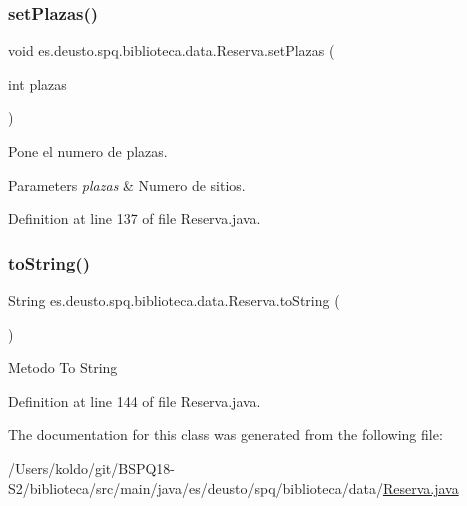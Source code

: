 \subsubsection{\texorpdfstring{set\+Plazas()}{setPlazas()}}
{\footnotesize\ttfamily void es.\+deusto.\+spq.\+biblioteca.\+data.\+Reserva.\+set\+Plazas (\begin{DoxyParamCaption}\item[{int}]{plazas }\end{DoxyParamCaption})}

Pone el numero de plazas. 
\begin{DoxyParams}{Parameters}
{\em plazas} & Numero de sitios. \\
\hline
\end{DoxyParams}


Definition at line 137 of file Reserva.\+java.

\mbox{\label{classes_1_1deusto_1_1spq_1_1biblioteca_1_1data_1_1_reserva_a07deac8f8e9adabfc2f927a22593c322}} 
\subsubsection{\texorpdfstring{to\+String()}{toString()}}
{\footnotesize\ttfamily String es.\+deusto.\+spq.\+biblioteca.\+data.\+Reserva.\+to\+String (\begin{DoxyParamCaption}{ }\end{DoxyParamCaption})}

Metodo To String 

Definition at line 144 of file Reserva.\+java.



The documentation for this class was generated from the following file\+:\begin{DoxyCompactItemize}
\item 
/\+Users/koldo/git/\+B\+S\+P\+Q18-\/\+S2/biblioteca/src/main/java/es/deusto/spq/biblioteca/data/\mbox{\hyperlink{_reserva_8java}{Reserva.\+java}}\end{DoxyCompactItemize}
